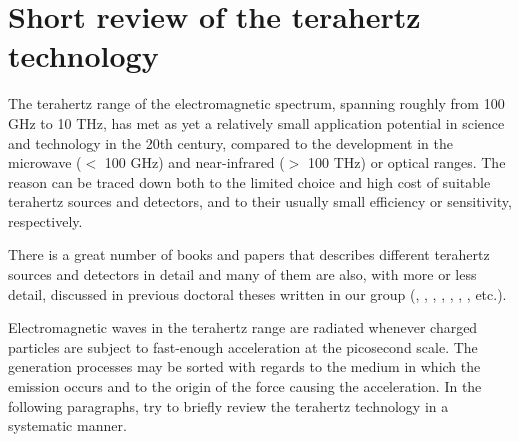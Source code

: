 \section{Short review of the terahertz technology}
The terahertz range of the electromagnetic spectrum, spanning roughly from 100 GHz to 10 THz, has met as yet a relatively small application potential in science and technology in the 20th century, compared to the development in the microwave ($<$ 100 GHz) and near-infrared ($>$ 100 THz) or optical ranges. The reason can be traced down both to the limited choice and high cost of suitable terahertz sources and detectors, and to their usually small efficiency or sensitivity, respectively. 

There is a great number of books and papers that describes different terahertz sources and detectors in detail \cite[pp. 155-158]{lee2008book}\cite{sullivan2012field,lewis2014review}
and many of them are also, with more or less detail, discussed in previous doctoral theses written in our group (\cite[pp. 2-30]{pashkin2004phd}, \cite[pp. 19-25]{nemec2006phd}, \cite[pp. 7-26]{fekete2008phd}, \cite[pp. 11-21]{sibik2010dp}, \cite[pp. 31-45]{yahiaoui2011phd}, \cite[pp. 33-38]{mics2012phd}, \cite[pp. 25-33]{skoromets2013phd}, etc.).

Electromagnetic waves in the terahertz range are radiated whenever charged particles are subject to fast-enough acceleration at the picosecond scale. 
The generation processes may be sorted with regards to the medium in which the emission occurs and to the origin of the force causing the acceleration.  
In the following paragraphs, try to briefly review the terahertz technology in a systematic manner.

